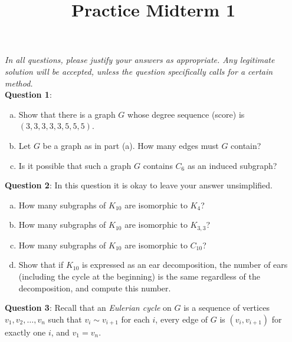 \documentclass{amsart}
\title{Practice Midterm 1}
\begin{document}
	
	\maketitle 
	
	\textit{In all questions, please justify your answers as appropriate. Any legitimate solution will be accepted, unless the question specifically calls for a certain method.}\\
	
	\noindent \textbf{Question 1}: 
	\begin{enumerate}[(a)]
		\item Show that there is a graph $G$ whose degree sequence (score) is $(3,3,3,3,3,5,5,5)$. \hfill \vspace{180px}
		
		\item Let $G$ be a graph as in part (a). How many edges must $G$ contain? \hfill \vspace{150px}
		
		\item Is it possible that such a graph $G$ contains $C_6$ as an induced subgraph? \vspace{100px}
	\end{enumerate}
	
	\newpage 
	
	\noindent \textbf{Question 2}: In this question it is okay to leave your answer unsimplified.
	\begin{enumerate}[(a)]
		\item How many subgraphs of $K_{10}$ are isomorphic to $K_4$? \vspace{100px}
		
		\item How many subgraphs of $K_{10}$ are isomorphic to $K_{3,3}$? \vspace{130px}
		
		\item How many subgraphs of $K_{10}$ are isomorphic to $C_{10}$? \vspace{150px}
		
		\item Show that if $K_{10}$ is expressed as an ear decomposition, the number of ears (including the cycle at the beginning) is the same regardless of the decomposition, and compute this number.
	\end{enumerate}
	
	
	\newpage \textbf{Question 3}: Recall that an \textit{Eulerian cycle} on $G$ is a sequence of vertices $v_1,v_2,\dots,v_n$ such that $v_i\sim v_{i+1}$ for each $i$, every edge of $G$ is $(v_i,v_{i+1})$ for exactly one $i$, and $v_1=v_n$.
	
\end{document}
